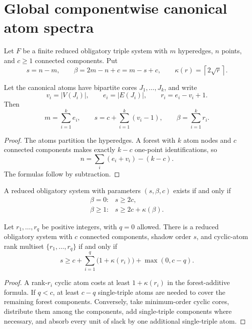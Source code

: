 \section{Global componentwise canonical atom spectra}

Let \(F\) be a finite reduced obligatory triple system with \(m\) hyperedges,
\(n\) points, and \(c\ge1\) connected components.  Put
\[
 s=n-m,\qquad
 \beta=2m-n+c=m-s+c,
 \qquad
 \kappa(r)=\left\lceil2\sqrt r\right\rceil.
\]

\begin{theorem}
Let the canonical atoms have bipartite cores \(J_1,\ldots,J_k\), and write
\[
 v_i=|V(J_i)|,\qquad
 e_i=|E(J_i)|,\qquad
 r_i=e_i-v_i+1.
\]
Then
\[
 m=\sum_{i=1}^k e_i,\qquad
 s=c+\sum_{i=1}^k(v_i-1),\qquad
 \beta=\sum_{i=1}^k r_i.
\]
\end{theorem}

\begin{proof}
The atoms partition the hyperedges.  A forest with \(k\) atom nodes and \(c\)
connected components makes exactly \(k-c\) one-point identifications, so
\[
 n=\sum_i(e_i+v_i)-(k-c).
\]
The formulas follow by subtraction.
\end{proof}

\begin{corollary}
A reduced obligatory system with parameters \((s,\beta,c)\) exists if and only
if
\[
 \begin{array}{ll}
 \beta=0:&s\ge2c,\\
 \beta\ge1:&s\ge2c+\kappa(\beta).
 \end{array}
\]
\end{corollary}

\begin{theorem}
Let \(r_1,\ldots,r_q\) be positive integers, with \(q=0\) allowed.  There is a
reduced obligatory system with \(c\) connected components, shadow order \(s\),
and cyclic-atom rank multiset \(\{r_1,\ldots,r_q\}\) if and only if
\[
 s\ge
 c+\sum_{i=1}^q\bigl(1+\kappa(r_i)\bigr)
 +\max(0,c-q).
\]
\end{theorem}

\begin{proof}
A rank-\(r_i\) cyclic atom costs at least \(1+\kappa(r_i)\) in the
forest-additive formula.  If \(q<c\), at least \(c-q\) single-triple atoms are
needed to cover the remaining forest components.  Conversely, take
minimum-order cyclic cores, distribute them among the components, add
single-triple components where necessary, and absorb every unit of slack by
one additional single-triple atom.
\end{proof}

